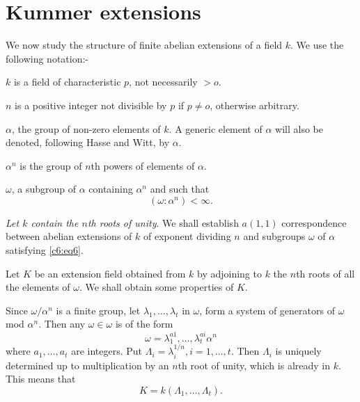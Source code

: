 \section{Kummer extensions}\label{c6:s6}%

We now study the structure of finite abelian extensions of a field
$k$. We use the following notation:- 

$k$ is a field of characteristic $p$, not necessarily $>o$. 

$n$ is a positive integer not divisible by $p$ if $p \neq o$,
otherwise arbitrary. 

$\alpha$, the group of non-zero elements of $k$. A generic element of
$\alpha$ will also be denoted, following Hasse and Witt, by $\alpha$. 

$\alpha^n$ is the group of $n$th powers of elements of $\alpha$.

$\omega$, a subgroup of $\alpha$ containing $\alpha^n$ and such that 
\begin{equation*}
(\omega:\alpha^n) < \infty. \tag{6}\label{c6:eq6}
\end{equation*}

\textit{Let $k$ contain the $n$th roots of unity}. We shall establish
$a(1,1)$ correspondence between abelian extensions of $k$ of exponent
dividing $n$ and subgroups $\omega$ of $\alpha$ satisfying \eqref{c6:eq6}. 

Let $K$ be an extension field obtained from $k$ by adjoining to $k$
the $n$th roots of all the elements of $\omega$. We shall obtain some
properties of $K$. 

Since $\omega/\alpha^n$ is a finite group, let $\lambda_1, \ldots,
\lambda_t$ in $\omega$, form a system of generators of $\omega$ mod
$\alpha^n$. Then any $\omega \in \omega$ is of the form  
$$
\omega = \lambda^{a1}_{1}, \ldots, \lambda^{ai}_t \alpha^n
$$
where $a_1, \ldots, a_t$ are integers. Put $\Lambda_i =
\lambda^{1/n}_i, i=1, \ldots,t$. Then $\Lambda_i$ is uniquely
determined up to multiplication by an $n$th root of unity, which is
already in $k$. This means that  
$$
K=k(\Lambda_1, \ldots, \Lambda_t).
$$\pageoriginale

